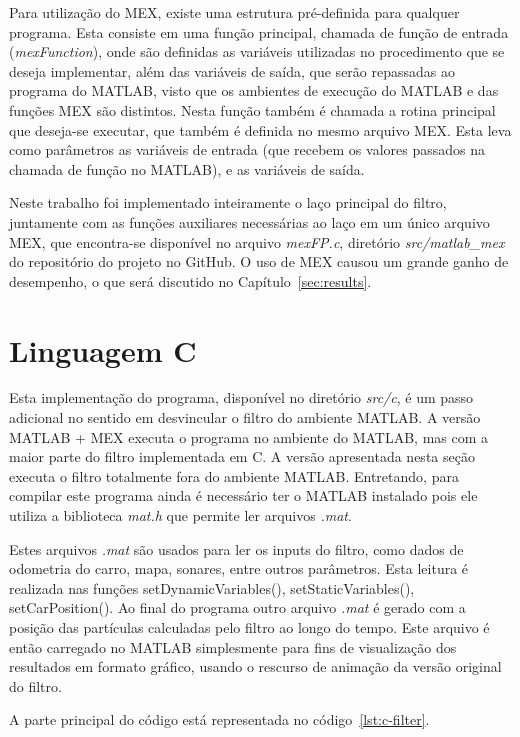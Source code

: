 \documentclass[
	12pt,				%
	openright,			%
	oneside,			%
	a4paper,			%
	english,			%
	french,				%
	spanish,			%
	brazil,				%
	]{abntex2}
\newcommand\todo[1]{~\newline{\color{red}\framebox[\columnwidth]{\parbox{.95\linewidth}{TODO: #1}}}~\newline}
\newcommand\todo[1]{}
\begin{document}
Para utilização do MEX, existe uma estrutura pré-definida para qualquer programa. Esta consiste em uma função principal, chamada de função de entrada (\emph{mexFunction}), onde são definidas as variáveis utilizadas no procedimento que se deseja implementar, além das variáveis de saída, que serão repassadas ao programa do MATLAB, visto que os ambientes de execução do MATLAB e das funções MEX são distintos. Nesta função também é chamada a rotina principal que deseja-se executar, que também é definida no mesmo arquivo MEX. Esta leva como parâmetros as variáveis de entrada (que recebem os valores passados na chamada de função no MATLAB), e as variáveis de saída.

Neste trabalho foi implementado inteiramente o laço principal do filtro, juntamente com as funções auxiliares necessárias ao laço em um único arquivo MEX, que encontra-se disponível no arquivo \emph{mexFP.c}, diretório \emph{src/matlab\_mex} do repositório do projeto no GitHub. O uso de MEX causou um grande ganho de desempenho, o que será discutido no Capítulo~\ref{sec:results}.

\section{Linguagem C}
\label{sec:linguagem_c}


Esta implementação do programa, disponível no diretório \emph{src/c}, é um passo adicional no sentido em desvincular o filtro do ambiente MATLAB. A versão MATLAB + MEX executa o programa no ambiente do MATLAB, mas com a maior parte do filtro implementada em C. A versão apresentada nesta seção executa o filtro totalmente fora do ambiente MATLAB. Entretando, para compilar este programa ainda é necessário ter o MATLAB instalado pois ele utiliza a biblioteca \emph{mat.h} que permite ler arquivos \emph{.mat}.

Estes arquivos \emph{.mat} são usados para ler os inputs do filtro, como dados de odometria do carro, mapa, sonares, entre outros parâmetros. Esta leitura é realizada nas funções setDynamicVariables(), setStaticVariables(), setCarPosition().
Ao final do programa outro arquivo \emph{.mat} é gerado com a posição das partículas calculadas pelo filtro ao longo do tempo. Este arquivo é então carregado no MATLAB simplesmente para fins de visualização dos resultados em formato gráfico, usando o rescurso de animação da versão original do filtro.

A parte principal do código está representada no código~\ref{lst:c-filter}.
\end{document}
